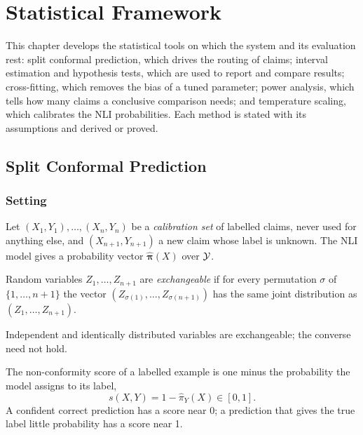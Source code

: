 \chapter{Statistical Framework}
\label{ch:stats}

This chapter develops the statistical tools on which the system and its evaluation rest: split conformal prediction, which drives the routing of claims; interval estimation and hypothesis tests, which are used to report and compare results; cross-fitting, which removes the bias of a tuned parameter; power analysis, which tells how many claims a conclusive comparison needs; and temperature scaling, which calibrates the NLI probabilities. Each method is stated with its assumptions and derived or proved.

\section{Split Conformal Prediction}
\label{sec:conformal}

\subsection{Setting}

Let $(X_1, Y_1), \dots, (X_n, Y_n)$ be a \emph{calibration set} of labelled claims, never used for anything else, and $(X_{n+1}, Y_{n+1})$ a new claim whose label is unknown. The NLI model gives a probability vector $\hat{\bm{\pi}}(X)$ over $\mathcal{Y}$.

\begin{definition}[Exchangeability]
Random variables $Z_1, \dots, Z_{n+1}$ are \emph{exchangeable} if for every permutation $\sigma$ of $\{1, \dots, n+1\}$ the vector $(Z_{\sigma(1)}, \dots, Z_{\sigma(n+1)})$ has the same joint distribution as $(Z_1, \dots, Z_{n+1})$.
\end{definition}

Independent and identically distributed variables are exchangeable; the converse need not hold.

\begin{definition}
The non-conformity score of a labelled example is one minus the probability the model assigns to its label,
\begin{equation}
  s(X, Y) = 1 - \hat{\pi}_Y(X) \in [0, 1].
\end{equation}
A confident correct prediction has a score near 0; a prediction that gives the true label little probability has a score near 1.
\end{definition}

